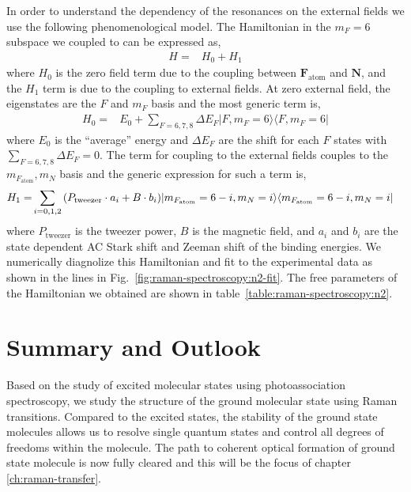 In order to understand the dependency of the resonances on the external fields
we use the following phenomenological model.
The Hamiltonian in the $m_F=6$ subspace we coupled to can be expressed as,
\begin{align*}
  H=&H_0+H_1
\end{align*}
where $H_0$ is the zero field term due to the coupling
between $\mathbf{F}_{\mathrm{atom}}$ and $\mathbf{N}$,
and the $H_1$ term is due to the coupling to external fields.
At zero external field, the eigenstates are the $F$ and $m_F$ basis
and the most generic term is,
\begin{align*}
  H_0=&E_0+\!\!\sum_{F=6,7,8}\Delta E_F|F,m_F=6\rangle\langle F,m_F=6|
\end{align*}
where $E_0$ is the ``average'' energy and $\Delta E_F$ are the shift for each $F$ states
with $\sum_{F=6,7,8}\Delta E_F = 0$.
The term for coupling to the external fields couples to the $m_{F_\mathrm{atom}},m_N$ basis
and the generic expression for such a term is,
\begin{align*}
  H_1=&\sum_{i=0,1,2}{\left({P_{\mathrm{tweezer}}\cdot a_i+B\cdot b_i}\right)}|m_{F_\mathrm{atom}}=6-i,m_N=i\rangle\langle m_{F_\mathrm{atom}}=6-i,m_N=i|
\end{align*}
where $P_{\mathrm{tweezer}}$ is the tweezer power, $B$ is the magnetic field,
and $a_i$ and $b_i$ are the state dependent AC Stark shift and Zeeman shift
of the binding energies.
We numerically diagnolize this Hamiltonian and fit to the experimental data
as shown in the lines in Fig.~\ref{fig:raman-spectroscopy:n2-fit}.
The free parameters of the Hamiltonian we obtained are shown in
table~\ref{table:raman-spectroscopy:n2}.

\section{Summary and Outlook}
\label{ch:raman-spectroscopy:summary}
Based on the study of excited molecular states using photoassociation spectroscopy,
we study the structure of the ground molecular state using Raman transitions.
Compared to the excited states, the stability of the ground state molecules
allows us to resolve single quantum states and
control all degrees of freedoms within the molecule.
The path to coherent optical formation of ground state molecule
is now fully cleared and this will be the focus of chapter \ref{ch:raman-transfer}.
